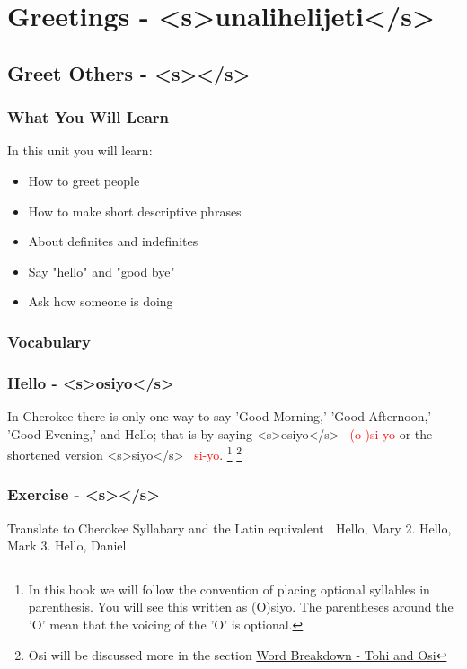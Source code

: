 \chapter{Greetings - <s>unalihelijeti</s>}

\section{Greet Others - <s></s>}
\subsection{What You Will Learn}
In this unit you will learn:
\begin{itemize}
    \item How to greet people
    \item How to make short descriptive phrases
    \item About definites and indefinites
    \item Say "hello" and "good  bye"
    \item Ask how someone is doing
\end{itemize}
\vfill
\subsection{Vocabulary}


\subsection{Hello - <s>osiyo</s>}

In Cherokee there is only one way to say 'Good Morning,' 'Good Afternoon,' 'Good Evening,' and Hello; that is by saying <s>osiyo</s> \  \textcolor{red} {(o-)si-yo} or the shortened version <s>siyo</s> \ \textcolor{red} {si-yo}.
\footnote{In this book we will follow the convention of placing optional syllables in parenthesis.  You will see this written as (O)siyo.  The parentheses around the 'O' mean that the voicing of the 'O' is optional.}
\footnote{Osi will be discussed more in the section \hyperref[sec:wordBreakdownTohiOsi]{Word Breakdown - Tohi and Osi}}

\subsection{Exercise - <s></s>}
\noindent Translate to Cherokee Syllabary and the Latin equivalent . Hello, Mary 2. Hello, Mark 3. Hello, Daniel

